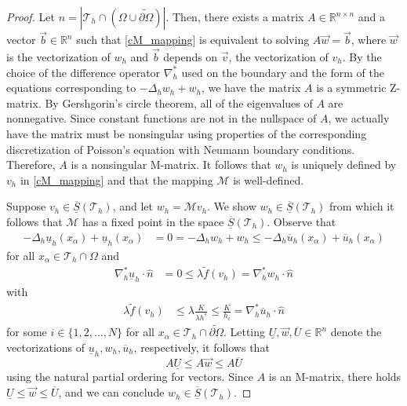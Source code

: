 \documentclass[10pt,a4paper]{amsart}
\begin{document}
\begin{proof}
Let $n = | \mathcal{T}_h \cap (\Omega \cup \widetilde{\partial \Omega}) |$. 
Then, there exists a matrix $A \in \mathbb{R}^{n \times n}$ and a vector $\vec{b} \in \mathbb{R}^n$ such that 
\eqref{cM_mapping} is equivalent to solving $A \vec{w} = \vec{b}$, 
where $\vec{w}$ is the vectorization of $w_h$ 
and $\vec{b}$ depends on $\vec{v}$, the vectorization of $v_h$.  
By the choice of the difference operator $\nabla_h^*$ used on the boundary 
and the form of the equations corresponding to $-\Delta_h w_h + w_h$, 
we have the matrix $A$ is a symmetric Z-matrix.  
By Gershgorin's circle theorem, all of the eigenvalues of $A$ are nonnegative.  
Since constant functions are not in the nullspace of $A$, we actually have the matrix must be 
nonsingular using properties of the corresponding discretization of Poisson's equation with Neumann boundary conditions.  
Therefore, $A$ is a nonsingular M-matrix.  
It follows that $w_h$ is uniquely defined by $v_h$ in \eqref{cM_mapping} and that the mapping $\mathcal{M}$ is well-defined.  

Suppose $v_h \in \overline{\underline{S}}(\mathcal{T}_h)$, and let $w_h = \mathcal{M} v_h$.  
We show $w_h \in \overline{\underline{S}}(\mathcal{T}_h)$ 
from which it follows that $\mathcal{M}$ has a fixed point in the space $\overline{\underline{S}}(\mathcal{T}_h)$.  
Observe that 
\begin{align*}
    -\Delta_h \underline{u}_h(x_\alpha) + \underline{u}_h(x_\alpha) 
    & = 0 
    = -\Delta_{h} w_{h}+ w_{h} 
    \leq -\Delta_h \overline{u}_h(x_\alpha) + \overline{u}_h(x_\alpha) 
\end{align*}
for all $x_\alpha \in \mathcal{T}_h \cap \Omega$ 
and 
\begin{align*}
    \nabla_h^* \underline{u}_{h}  \cdot \widehat{n} 
    & = 0 
    \leq \lambda \widetilde{f}(v_h) 
    = \nabla_h^* w_{h}  \cdot \widehat{n}  
\end{align*}
with
\begin{align*}
    \lambda \widetilde{f}(v_h) 
    & \leq \lambda \frac{K}{\lambda h^*} 
    \leq \frac{K}{h_i} 
    = \nabla_h^* \overline{u}_{h}  \cdot \widehat{n} 
\end{align*}
for some $i \in \{1,2,\ldots,N\}$ 
for all $x_\alpha \in \mathcal{T}_h \cap \widetilde{\partial \Omega}$.  
Letting $\underline{U}, \vec{w}, \overline{U} \in \mathbb{R}^n$ denote the vectorizations of 
$\underline{u}_h, w_h, \overline{u}_h$, respectively, 
it follows that 
\[
    A \underline{U} \leq A \vec{w} \leq A \overline{U}  
\]
using the natural partial ordering for vectors.  
Since $A$ is an M-matrix, there holds $\underline{U} \leq \vec{w} \leq \overline{U}$, 
and we can conclude $w_h \in \overline{\underline{S}}(\mathcal{T}_h)$.  
\end{proof}
\end{document}
